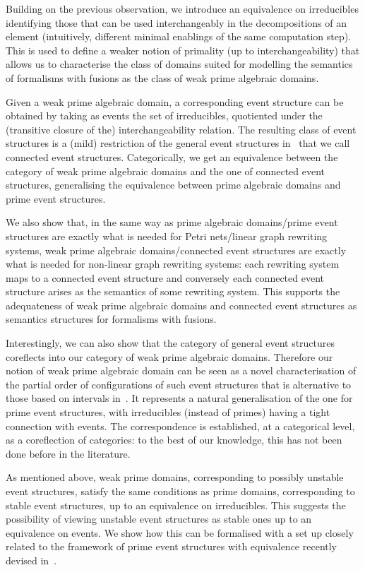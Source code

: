\documentclass[conference]{IEEEtran}
\begin{document}
Building on the previous observation, we introduce an equivalence on irreducibles
identifying those that can be used interchangeably in the
decompositions of an element (intuitively, different minimal enablings
of the same {computation step}). This is used to define a weaker notion of primality
(up to interchangeability) that allows us to characterise the class of domains
suited for modelling the semantics of formalisms with fusions {as}
the class of weak prime algebraic domains.

Given a weak prime algebraic domain, a corresponding event structure
can be obtained by taking as events the set of irreducibles,
quotiented under the (transitive closure of the) interchangeability
relation. The resulting class of event structures is a (mild)
restriction of the general event structures in~\cite{Win:ES}
that we call connected event structures. Categorically, we get an
equivalence between the category of weak prime algebraic domains and
the one of connected event structures, generalising the equivalence
between prime algebraic domains and prime event structures.

We also show that, in the same way as prime algebraic domains/prime
event structures are exactly what is needed for Petri nets/linear graph 
rewriting systems, weak prime
algebraic domains/connected event structures are exactly what is needed
for non-linear graph rewriting systems: each rewriting system maps to
a connected event structure and conversely each connected event structure
arises as the semantics of some rewriting system. This supports the
adequateness of weak prime algebraic domains and connected event
structures as semantics structures for formalisms with fusions.

Interestingly, we can also show that the category of general
event structures~\cite{Win:ES} coreflects into our category of weak
prime algebraic domains. Therefore our notion of weak prime algebraic
domain can be seen as a novel characterisation of the partial order of
configurations of such event structures that is alternative to those
based on intervals in~\cite{Winskel:phd,Dro:ESD}.  It represents a
natural generalisation of the one for prime event structures, with
irreducibles (instead of primes) having a tight connection with
events. The correspondence is established, at a categorical level, as a
coreflection of categories:
to the best of our knowledge, this {has} not been done before in the literature.


As mentioned above, weak prime domains, corresponding to possibly
unstable event structures, satisfy the same conditions as prime
domains, corresponding to stable event structures, up to an
equivalence on irreducibles. This suggests the possibility of viewing
unstable event structures as stable ones up to an equivalence on
events.
%
We show how this can be formalised  with a set up closely
related to the framework of prime event structures with equivalence 
recently devised in~\cite{win2017,VismeW19}.
\end{document}
